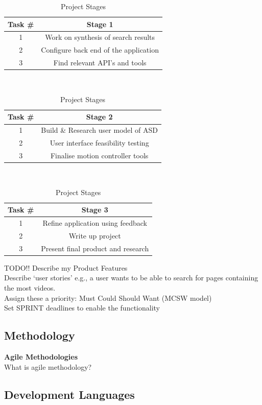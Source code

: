 \documentclass[10pt]{article}
\begin{document}
\begin{table}
\caption{Project Stages} 
\centering 
\begin{tabular}{c c}
\hline\hline 
Task \# & Stage 1 \\ [0.5ex]
\hline 
1 & Work on synthesis of search results\\
2 & Configure back end of the application\\
3 & Find relevant API’s and tools\\[1ex]
\hline 
\end{tabular}\\ 
\begin{tabular}{c c}\\
\hline\hline 
Task \# & Stage 2\\  [0.5ex]
\hline 
1 & Build \& Research user model of ASD  \\ 
2 & User interface feasibility testing\\
3 & Finalise motion controller tools  \\[1ex]
\hline 
\end{tabular}\\
\begin{tabular}{c c}\\
\hline\hline 
Task \# & Stage 3\\  [0.5ex]
\hline 
1 & Refine application using feedback \\ 
2 & Write up project \\
3 & Present final product and research \\[1ex]
\hline 
\end{tabular}
\label{stages} 
\end{table}

TODO!!
Describe my Product Features\\
Describe ‘user stories’ e.g., a user wants to be able to search for pages containing the most videos.\\
Assign these a priority: Must Could Should Want (MCSW model)\\
Set SPRINT deadlines to enable the functionality


\subsection{Methodology}
\textbf{Agile Methodologies}\\
What is agile methodology?\\



\subsection{Development Languages}
\end{document}
